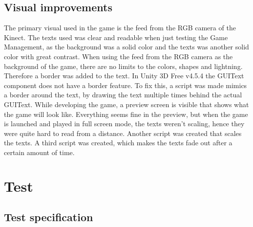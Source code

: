 \documentclass[11pt]{report}
\begin{document}
\section{Visual improvements}
The primary visual used in the game is the feed from the RGB camera of the Kinect. The texts used was clear and readable when just testing the Game Management, as the background was a solid color and the texts was another solid color with great contrast. When using the feed from the RGB camera as the background of the game, there are no limits to the colors, shapes and lightning. Therefore a border was added to the text. In Unity 3D Free v4.5.4 the GUIText component does not have a border feature. To fix this, a script was made mimics a border around the text, by drawing the text multiple times behind the actual GUIText. While developing the game, a preview screen is visible that shows what the game will look like. Everything seems fine in the preview, but when the game is launched and played in full screen mode, the texts weren't scaling, hence they were quite hard to read from a distance. Another script was created that scales the texts. A third script was created, which makes the texts fade out after a certain amount of time.

\chapter{Test}
\section{Test specification}
\end{document}
